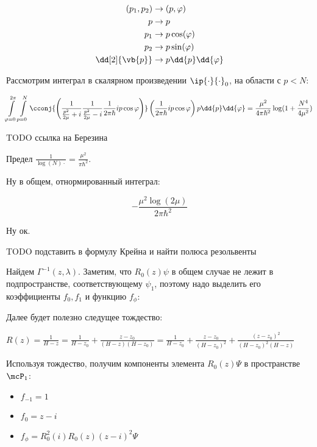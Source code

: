 \begin{align*}
(p_1, p_2) &\to (p, \varphi) \\
p &\to p \\
p_1 &\to p \cos(\varphi) \\
p_2 &\to p \sin(\varphi) \\
\dd[2]{\vb{p}} &\to p \dd{p} \dd{\varphi}
\end{align*}

Рассмотрим интеграл в скалярном произведении $\ip{\cdot}{\cdot}_0$, на области с $p < N$:

\[
\int\limits_{\varphi = 0}^{2 \pi} \int\limits_{p = 0}^N
\cconj{\left(
\frac{1}{\frac{p^2}{2 \mu} + i} \frac{1}{\frac{p^2}{2 \mu} - i} \frac{1}{2 \pi \hbar} i p \cos \varphi
\right)}
\left(
\frac{1}{2 \pi \hbar} i p \cos \varphi
\right)
p \dd{p} \dd{\varphi}
=
\frac{\mu^2}{4 \pi \hbar^2} \log(1 + \frac{N^4}{4 \mu^2})
\]

TODO ссылка на Березина

Предел $\frac{1}{\log(N) \cdot} = \frac{\mu^2}{\pi \hbar^2}$.

Ну в общем, отнормированный интеграл:

\[
-\frac{\mu^2 \log (2 \mu)}{2 \pi  \hbar ^2}
\]

Ну ок.

TODO подставить в формулу Крейна и найти полюса резольвенты

Найдем $\Gamma^{-1}(z, \lambda)$. Заметим, что $R_0(z) \psi$ в общем случае не лежит в подпространстве, соответствующему $\psi_1$, поэтому надо выделить его коэффициенты $f_0, f_1$ и функцию $f_\phi$:


Далее будет полезно следущее тождество:

$R(z) = \frac{1}{H - z} = \frac{1}{H - z_0} + \frac{z - z_0}{(H - z)(H - z_0)} = \frac{1}{H - z_0} + \frac{z - z_0}{(H - z_0)^2} + \frac{(z - z_0)^2}{(H - z_0)^2 (H - z)}$

Используя тождество, получим компоненты элемента $R_0(z) \Psi$ в пространстве $\mcP_1$:

\begin{itemize}
\item $f_{-1} = 1$
\item $f_0 = z - i$
\item $f_\phi = R_0^2(i) R_0(z) (z - i)^2 \Psi$
\end{itemize}


